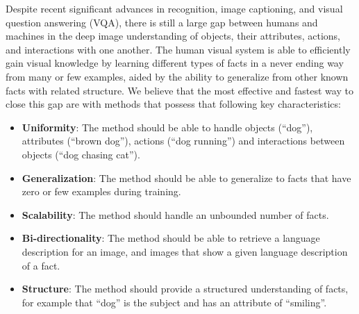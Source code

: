 \documentclass[runningheads]{llncs}
\begin{document}
Despite recent significant advances in recognition, image captioning, and visual question answering (VQA), there is still a large gap between humans and machines in the deep image understanding of objects, their attributes, actions, and interactions with one another. The human visual system is able to efficiently gain visual knowledge by learning different types of facts in a never ending way from many or few examples, aided by the ability to generalize from other known facts with related structure. We believe that the most effective and fastest way to close this gap are with methods that possess that following key characteristics:
\begin{itemize}
	\item \textbf{Uniformity}:  The method should be able to handle objects (``dog''), attributes (``brown dog''), actions (``dog running'') and interactions between objects (``dog chasing cat'').
	\item \textbf{Generalization}:  The method should be able to generalize to facts
that have zero or few examples during training.
	\item \textbf{Scalability}:  The method should handle an unbounded number of facts.
	\item \textbf{Bi-directionality}:  The method should be able to retrieve a language description for an image, and images that show a given language description of a fact.
	\item \textbf{Structure}:  The method should provide a structured understanding of facts, for example that ``dog'' is the subject and has an attribute of ``smiling''. %
\end{itemize}%
\end{document}
